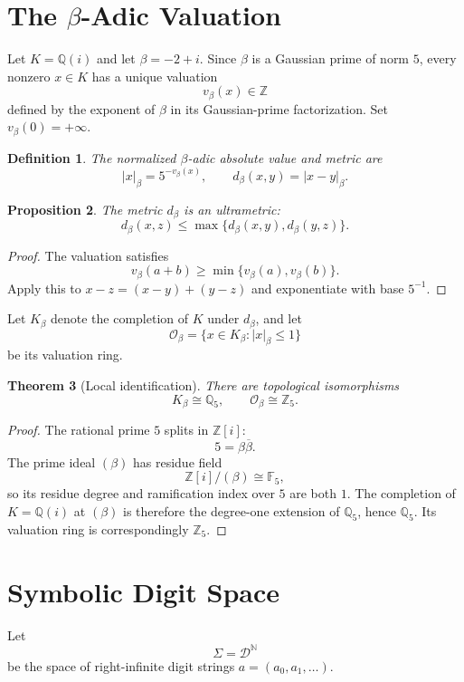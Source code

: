 \documentclass[11pt]{article}
\newtheorem{theorem}{Theorem}[section]
\newtheorem{proposition}[theorem]{Proposition}
\newtheorem{definition}[theorem]{Definition}
\newcommand{\Z}{\mathbb Z}
\newcommand{\Q}{\mathbb Q}
\newcommand{\F}{\mathbb F}
\newcommand{\N}{\mathbb N}
\newcommand{\Zi}{\Z[i]}
\newcommand{\Qi}{\Q(i)}
\newcommand{\Db}{\mathcal D}
\newcommand{\Ob}{\mathcal O_\beta}
\newcommand{\Kb}{K_\beta}
\begin{document}
\section{The \texorpdfstring{$\beta$}{beta}-Adic Valuation}

Let $K=\Qi$ and let $\beta=-2+i$.  Since $\beta$ is a Gaussian prime of norm $5$, every nonzero $x\in K$ has a unique valuation
\[
v_\beta(x)\in\Z
\]
defined by the exponent of $\beta$ in its Gaussian-prime factorization.  Set $v_\beta(0)=+\infty$.

\begin{definition}
The normalized $\beta$-adic absolute value and metric are
\[
|x|_\beta=5^{-v_\beta(x)},\qquad
d_\beta(x,y)=|x-y|_\beta.
\]
\end{definition}

\begin{proposition}
The metric $d_\beta$ is an ultrametric:
\[
d_\beta(x,z)\le \max\{d_\beta(x,y),d_\beta(y,z)\}.
\]
\end{proposition}

\begin{proof}
The valuation satisfies
\[
v_\beta(a+b)\ge \min\{v_\beta(a),v_\beta(b)\}.
\]
Apply this to $x-z=(x-y)+(y-z)$ and exponentiate with base $5^{-1}$.
\end{proof}

Let $\Kb$ denote the completion of $K$ under $d_\beta$, and let
\[
\Ob=\{x\in\Kb:|x|_\beta\le1\}
\]
be its valuation ring.

\begin{theorem}[Local identification]
There are topological isomorphisms
\[
\Kb\cong\Q_5,\qquad \Ob\cong\Z_5.
\]
\end{theorem}

\begin{proof}
The rational prime $5$ splits in $\Zi$:
\[
5=\beta\overline\beta.
\]
The prime ideal $(\beta)$ has residue field
\[
\Zi/(\beta)\cong\F_5,
\]
so its residue degree and ramification index over $5$ are both $1$.  The completion of $K=\Q(i)$ at $(\beta)$ is therefore the degree-one extension of $\Q_5$, hence $\Q_5$.  Its valuation ring is correspondingly $\Z_5$.
\end{proof}

\section{Symbolic Digit Space}

Let
\[
\Sigma=\Db^\N
\]
be the space of right-infinite digit strings $a=(a_0,a_1,\ldots)$.
\end{document}
